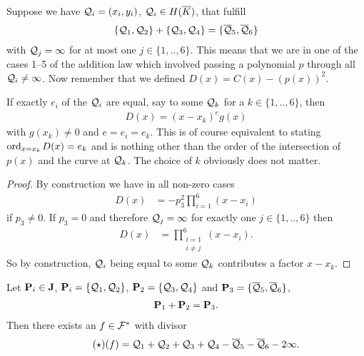 \documentclass[english,11pt,a4paper]{article}
\begin{document}
\begin{lemma}\label{mult}
  Suppose we have $\q_i = (x_i, y_i)$, $\q_i \in \ekb$, that fulfill
  \begin{align*}
    \{ \q_1 , \q_2\}+\{\q_3 , \q_4\} = \{\bar \q_5 , \bar \q_6 \}
  \end{align*}
  with $\q_j = \infty$ for at most one $j \in \{1,..,6\}$. This means that we are in one of the cases 1--5 of the addition law which involved passing a polynomial $p$ through all $\q_i \neq \infty$. Now remember that we defined $D(x) = C(x) - (p(x))^2$.

  If exactly $e_i$ of the $\q_i$ are equal, say to some $\q_k$ for a $k \in \{1,..,6\}$, then
  \begin{align*} %
    D(x) = (x-x_k)^e g(x)
  \end{align*}
  with $g(x_k) \neq 0$ and $e = e_i = e_k$. This is of course equivalent to stating $\text{ord}_{x=x_k}\hspace{0.4mm} D(x) = e_k$ and is nothing other than the order of the intersection of $p(x)$ and the curve at $\q_k$. The choice of $k$ obviously does not matter.
  \begin{proof} %
    By construction we have in all non-zero cases%
    \begin{align*}
      D(x) &= -p_3^2\prod_{i=1}^6(x-x_i)
    \end{align*}
    if $p_3 \neq 0$. If $p_3 = 0$ and therefore $\q_j = \infty$ for exactly one $j \in \{1,..,6\}$ then
    \begin{align*}
      D(x) &=  \prod_{\substack{i=1\\i \neq j}}^6(x-x_i).
    \end{align*}
    So by construction, $\q_i$ being equal to some $\q_k$ contributes a factor $x-x_k$.    %
  \end{proof}
\end{lemma}



\begin{theorem}
  Let $\P_i \in \J$, $\P_i = \{ \q_1, \q_2 \}$, $\P_2 = \{ \q_3, \q_4 \}$ and $\P_3 = \{ \bar \q_5, \bar \q_6 \}$,
  \begin{align*}
    \P_1 + \P_2 = \P_3.
  \end{align*}
  Then there exists an $f \in \F^*$ with divisor
  \begin{align*}\label{f}\tag{$\star$} %
    (f) = \q_1 + \q_2 + \q_3 + \q_4 - \bar \q_5 - \bar \q_6 - 2 \infty.
  \end{align*}
\end{theorem}
\end{document}
